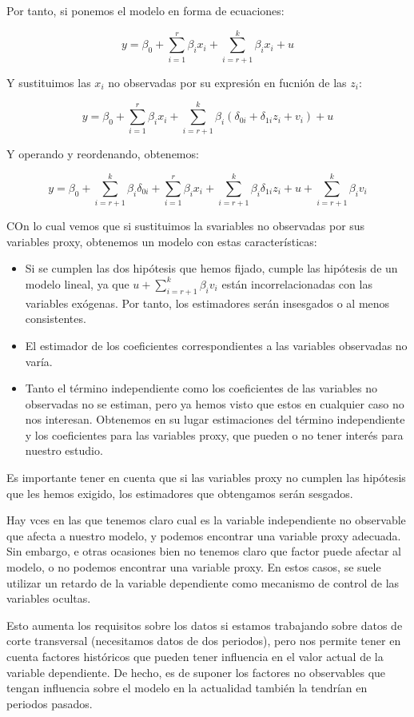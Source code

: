 Por tanto, si ponemos el modelo en forma de ecuaciones:

\[y=\beta_0+\sum_{i=1}^r\beta_ix_i+\sum_{i=r+1}^k\beta_ix_i+u\]

Y sustituimos las $x_i$ no observadas por su expresi\'on en fucni\'on de las $z_i$:

\[y=\beta_0+\sum_{i=1}^r\beta_ix_i+\sum_{i=r+1}^k\beta_i(\delta_{0i}+\delta_{1i}z_i+v_i)+u\]

Y operando y reordenando, obtenemos:

\[y=\beta_0+\sum_{i=r+1}^k\beta_i\delta_{0i}+\sum_{i=1}^r\beta_ix_i+\sum_{i=r+1}^k\beta_i\delta_{1i}z_i+u+\sum_{i=r+1}^k\beta_iv_i\]

COn lo cual vemos que si sustituimos la svariables no observadas por sus variables proxy, obtenemos un modelo con estas caracter\'isticas:
\begin{itemize}
\item Si se cumplen las dos hip\'otesis que hemos fijado, cumple las hip\'otesis de un modelo lineal, ya que $u+\sum_{i=r+1}^k\beta_iv_i$ est\'an incorrelacionadas con las variables ex\'ogenas. Por tanto, los estimadores ser\'an insesgados o al menos consistentes.
\item El estimador de los coeficientes correspondientes a las variables observadas no var\'ia.
\item Tanto el t\'ermino independiente como los coeficientes de las variables no observadas no se estiman, pero ya hemos visto que estos en cualquier caso no nos interesan. Obtenemos en su lugar estimaciones del t\'ermino independiente y los coeficientes para las variables proxy, que pueden o no tener inter\'es para nuestro estudio.
\end{itemize}

Es importante tener en cuenta que si las variables proxy no cumplen las hip\'otesis que les hemos exigido, los estimadores que obtengamos ser\'an sesgados.


Hay vces en las que tenemos claro cual es la variable independiente no observable que afecta a nuestro modelo, y podemos encontrar una variable proxy adecuada. Sin embargo, e otras ocasiones bien no tenemos claro que factor puede afectar al modelo, o no podemos encontrar una variable proxy. En estos casos, se suele utilizar un retardo de la variable dependiente como mecanismo de control de las variables ocultas.

Esto aumenta los requisitos sobre los datos si estamos trabajando sobre datos de corte transversal (necesitamos datos de dos periodos), pero nos permite tener en cuenta factores hist\'oricos que pueden tener influencia en el valor actual de la variable dependiente. De hecho, es de suponer los factores no observables que tengan influencia sobre el modelo en la actualidad tambi\'en la tendr\'ian en periodos pasados.

